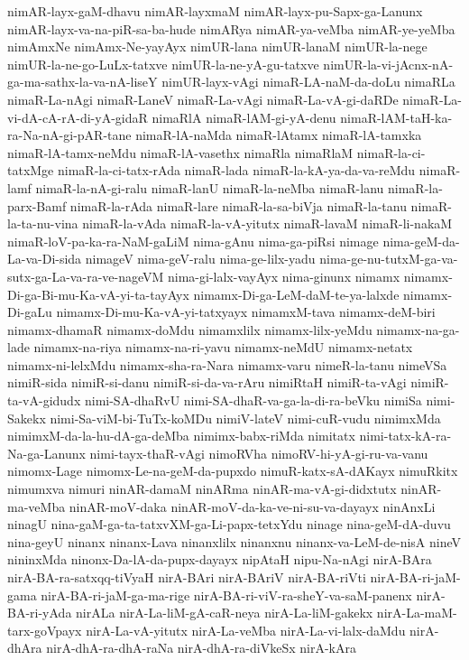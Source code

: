 {nimAR-layx-gaM-dhavu
nimAR-layxmaM
nimAR-layx-pu-Sapx-ga-Lanunx
nimAR-layx-va-na-piR-sa-ba-hude
nimARya
nimAR-ya-veMba
nimAR-ye-yeMba
nimAmxNe
nimAmx-Ne-yayAyx
nimUR-lana
nimUR-lanaM
nimUR-la-nege
nimUR-la-ne-go-LuLx-tatxve
nimUR-la-ne-yA-gu-tatxve
nimUR-la-vi-jAcnx-nA-ga-ma-sathx-la-va-nA-liseY
nimUR-layx-vAgi
nimaR-LA-naM-da-doLu
nimaRLa
nimaR-La-nAgi
nimaR-LaneV
nimaR-La-vAgi
nimaR-La-vA-gi-daRDe
nimaR-La-vi-dA-cA-rA-di-yA-gidaR
nimaRlA
nimaR-lAM-gi-yA-denu
nimaR-lAM-taH-ka-ra-Na-nA-gi-pAR-tane
nimaR-lA-naMda
nimaR-lAtamx
nimaR-lA-tamxka
nimaR-lA-tamx-neMdu
nimaR-lA-vasethx
nimaRla
nimaRlaM
nimaR-la-ci-tatxMge
nimaR-la-ci-tatx-rAda
nimaR-lada
nimaR-la-kA-ya-da-va-reMdu
nimaR-lamf
nimaR-la-nA-gi-ralu
nimaR-lanU
nimaR-la-neMba
nimaR-lanu
nimaR-la-parx-Bamf
nimaR-la-rAda
nimaR-lare
nimaR-la-sa-biVja
nimaR-la-tanu
nimaR-la-ta-nu-vina
nimaR-la-vAda
nimaR-la-vA-yitutx
nimaR-lavaM
nimaR-li-nakaM
nimaR-loV-pa-ka-ra-NaM-gaLiM
nima-gAnu
nima-ga-piRsi
nimage
nima-geM-da-La-va-Di-sida
nimageV
nima-geV-ralu
nima-ge-lilx-yadu
nima-ge-nu-tutxM-ga-va-sutx-ga-La-va-ra-ve-nageVM
nima-gi-lalx-vayAyx
nima-ginunx
nimamx
nimamx-Di-ga-Bi-mu-Ka-vA-yi-ta-tayAyx
nimamx-Di-ga-LeM-daM-te-ya-lalxde
nimamx-Di-gaLu
nimamx-Di-mu-Ka-vA-yi-tatxyayx
nimamxM-tava
nimamx-deM-biri
nimamx-dhamaR
nimamx-doMdu
nimamxlilx
nimamx-lilx-yeMdu
nimamx-na-ga-lade
nimamx-na-riya
nimamx-na-ri-yavu
nimamx-neMdU
nimamx-netatx
nimamx-ni-lelxMdu
nimamx-sha-ra-Nara
nimamx-varu
nimeR-la-tanu
nimeVSa
nimiR-sida
nimiR-si-danu
nimiR-si-da-va-rAru
nimiRtaH
nimiR-ta-vAgi
nimiR-ta-vA-gidudx
nimi-SA-dhaRvU
nimi-SA-dhaR-va-ga-la-di-ra-beVku
nimiSa
nimi-Sakekx
nimi-Sa-viM-bi-TuTx-koMDu
nimiV-lateV
nimi-cuR-vudu
nimimxMda
nimimxM-da-la-hu-dA-ga-deMba
nimimx-babx-riMda
nimitatx
nimi-tatx-kA-ra-Na-ga-Lanunx
nimi-tayx-thaR-vAgi
nimoRVha
nimoRV-hi-yA-gi-ru-va-vanu
nimomx-Lage
nimomx-Le-na-geM-da-pupxdo
nimuR-katx-sA-dAKayx
nimuRkitx
nimumxva
nimuri
ninAR-damaM
ninARma
ninAR-ma-vA-gi-didxtutx
ninAR-ma-veMba
ninAR-moV-daka
ninAR-moV-da-ka-ve-ni-su-va-dayayx
ninAnxLi
ninagU
nina-gaM-ga-ta-tatxvXM-ga-Li-papx-tetxYdu
ninage
nina-geM-dA-duvu
nina-geyU
ninanx
ninanx-Lava
ninanxlilx
ninanxnu
ninanx-va-LeM-de-nisA
nineV
nininxMda
ninonx-Da-lA-da-pupx-dayayx
nipAtaH
nipu-Na-nAgi
nirA-BAra
nirA-BA-ra-satxqq-tiVyaH
nirA-BAri
nirA-BAriV
nirA-BA-riVti
nirA-BA-ri-jaM-gama
nirA-BA-ri-jaM-ga-ma-rige
nirA-BA-ri-viV-ra-sheY-va-saM-panenx
nirA-BA-ri-yAda
nirALa
nirA-La-liM-gA-caR-neya
nirA-La-liM-gakekx
nirA-La-maM-tarx-goVpayx
nirA-La-vA-yitutx
nirA-La-veMba
nirA-La-vi-lalx-daMdu
nirA-dhAra
nirA-dhA-ra-dhA-raNa
nirA-dhA-ra-diVkeSx
nirA-kAra
}
